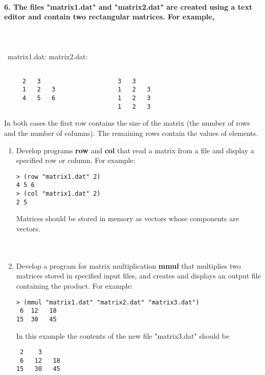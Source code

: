 \documentclass{article}
\begin{document}
\paragraph{6. The files "matrix1.dat" and "matrix2.dat" are created using a text editor and contain two rectangular matrices. For example, }\
\paragraph{}\
\quad matrix1.dat:		\qquad \qquad \qquad \qquad matrix2.dat:
\begin{verbatim}

     2   3                     3   3
     1   2   3                 1   2   3
     4   5   6                 1   2   3
                               1   2   3
\end{verbatim}
In both cases the first row contains the size of the matrix (the number of rows and the number of columns). The remaining rows contain the values of elements.

	\begin{enumerate}[label=(\alph*)]

	\item Develop programs \textbf{row} and \textbf{col} that read a matrix from a file and display a specified row or column. For example:
	
\begin{verbatim}
> (row "matrix1.dat" 2)
4 5 6
> (col "matrix1.dat" 2)
2 5
\end{verbatim}
	
	Matrices should be stored in memory as vectors whose components are vectors.
	\paragraph{}\
	
	\item Develop a program for matrix multiplication \textbf{mmul} that multiplies two matrices stored in specified input files, and creates and displays an output file containing the product. For example:
	
\begin{verbatim}
> (mmul "matrix1.dat" "matrix2.dat" "matrix3.dat")
 6  12   18
15  30   45
\end{verbatim}
In this example the contents of the new file "matrix3.dat" should be

\begin{verbatim}
 2    3
 6   12   18
15   30   45
\end{verbatim}
					
	\end{enumerate}
	
\end{document}
